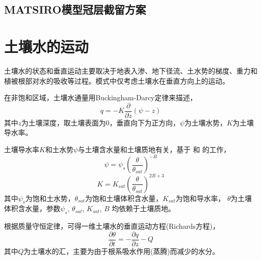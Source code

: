 \subsection{MATSIRO模型冠层截留方案}




\section{土壤水的运动}\label{sec:土壤水的运动}
土壤水的状态和垂直运动主要取决于地表入渗、地下径流、土水势的梯度、重力和植被根部对水的吸收等过程。模式中仅考虑土壤水在垂直方向上的运动。


在非饱和区域，土壤水通量用Buckingham-Darcy定律来描述，
\begin{equation}
q=-K \frac{\partial}{\partial z}(\psi-z)
\end{equation}
其中$z$为土壤深度，取土壤表面为0，垂直向下为正方向，$\psi$为土壤水势，$K$为土壤导水率。


土壤导水率$K$和土水势$\psi$与土壤含水量和土壤质地有关，基于 \citet{clapp1978empirical} 和 \citet{cosby1984statistical} 的工作，
\begin{equation}
\psi=\psi_{s}\left(\frac{\theta}{\theta_{sat}}\right)^{-B}
\end{equation}
\begin{equation}
K=K_{sat}\left(\frac{\theta}{\theta_{sat}}\right)^{2 B+3}
\end{equation}
其中$\psi_s$为饱和土水势，$\theta_{sat}$为饱和土壤体积含水量，$K_{sat}$为饱和导水率，
$\theta$为土壤体积含水量，参数$\psi_s$, $\theta_{sat}$, $K_{sat}$, $B$ 均依赖于土壤质地。


根据质量守恒定律，可得一维土壤水的垂直运动方程(Richards方程)，
\begin{equation}
\frac{\partial \theta}{\partial t}=-\frac{\partial q}{\partial z}-Q
\end{equation}
其中$Q$为土壤水的汇，主要为由于根系吸水作用(蒸腾)而减少的水分。


